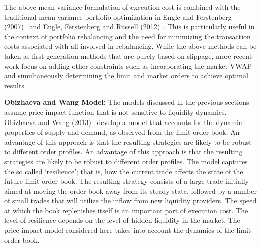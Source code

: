 The above mean-variance formulation of execution cost is combined with the traditional mean-variance portfolio optimization in Engle and Ferstenberg (2007)~\cite{engle2007} and Engle, Ferstenberg and Russell (2012)~\cite{engle2012}. This is particularly useful in the context of portfolio rebalancing and the need for minimizing the transaction costs associated with all  involved in rebalancing. While the above methods can be taken as first generation methods that are purely based on slippage, more recent work focus on adding other constraints such as incorporating the market VWAP and simultaneously determining the limit and market orders to achieve optimal results. \twomedskip


\noindent\textbf{Obizhaeva and Wang Model:} The models discussed in the previous sections assume price impact function that is not sensitive to liquidity dynamics. Obizhaeva and Wang (2013)~\cite{obizhaeva} develop a model that accounts for the dynamic properties of supply and demand, as observed from the limit order book. An advantage of this approach is that the resulting strategies are likely to be robust to different order profiles. An advantage of this approach is that the resulting strategies are likely to be robust to different order profiles. The model captures the so called `resilience'; that is, how the current trade affects the state of the future limit order book. The resulting strategy consists of a large trade initially aimed at moving the order book away from its steady state, followed by a number of small trades that will utilize the inflow from new liquidity providers. The speed at which the book replenishes itself is an important part of execution cost. The level of resilience depends on the level of hidden liquidity in the market. The price impact model considered here takes into account the dynamics of the limit order book.


